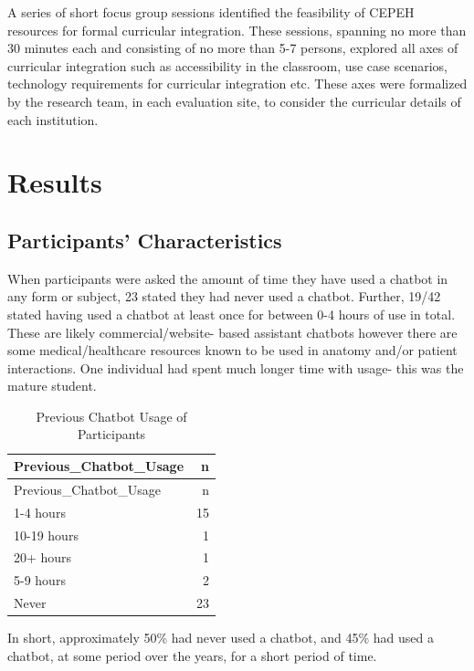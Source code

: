 \documentclass[a4paper, nobind]{templates/ociamthesis}
\begin{document}
A series of short focus group sessions identified the feasibility of CEPEH resources for formal curricular integration. These sessions, spanning no more than 30 minutes each and consisting of no more than 5-7 persons, explored all axes of curricular integration such as accessibility in the classroom, use case scenarios, technology requirements for curricular integration etc. These axes were formalized by the research team, in each evaluation site, to consider the curricular details of each institution.

\hypertarget{rmd-basics}{%
\chapter{Results}\label{rmd-basics}}

\minitoc 

\noindent

\hypertarget{participants-characteristics}{%
\section{Participants' Characteristics}\label{participants-characteristics}}

When participants were asked the amount of time they have used a chatbot
in any form or subject, 23 stated they had never used a chatbot.
Further, 19/42 stated having used a chatbot at least once for between
0-4 hours of use in total. These are likely commercial/website- based
assistant chatbots however there are some medical/healthcare resources
known to be used in anatomy and/or patient interactions. One individual
had spent much longer time with usage- this was the mature student.

\begin{longtable}[]{@{}lr@{}}
\caption{Previous Chatbot Usage of Participants\\
}\tabularnewline
\toprule()
Previous\_Chatbot\_Usage & n \\
\midrule()
\endfirsthead
\toprule()
Previous\_Chatbot\_Usage & n \\
\midrule()
\endhead
1-4 hours & 15 \\
10-19 hours & 1 \\
20+ hours & 1 \\
5-9 hours & 2 \\
Never & 23 \\
\bottomrule()
\end{longtable}

In short, approximately 50\% had never used a chatbot, and 45\% had used a
chatbot, at some period over the years, for a short period of time.
\end{document}
